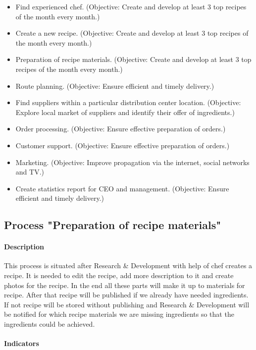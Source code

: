 \documentclass[11pt,a4paper]{article}
\begin{document}
\begin{itemize}
    \item Find experienced chef. (Objective: Create and develop at least 3 top recipes of the month every month.)
    \item Create a new recipe. (Objective: Create and develop at least 3 top recipes of the month every month.)
    \item Preparation of recipe materials. (Objective: Create and develop at least 3 top recipes of the month every month.)
    \item Route planning. (Objective: Ensure efficient and timely delivery.)
    \item Find suppliers within a particular distribution center location. (Objective: Explore local market of suppliers and identify their offer of ingredients.)
    \item Order processing. (Objective: Ensure effective preparation of orders.)
    \item Customer support. (Objective: Ensure effective preparation of orders.)
    \item Marketing. (Objective: Improve propagation via the internet, social networks and TV.)
    \item Create statistics report for CEO and management. (Objective: Ensure efficient and timely delivery.)
\end{itemize}

\newpage

\subsection{Process "Preparation of recipe materials"}

\paragraph{Description}

This process is situated after Research \& Development with help of chef creates a recipe. It is needed to edit the recipe, add more description to it and create photos for the recipe. In the end all these parts will make it up to materials for recipe. After that recipe will be published if we already have needed ingredients. If not recipe will be stored without publishing and Research \& Development will be notified for which recipe materials we are missing ingredients so that the ingredients could be achieved.

\paragraph{Indicators}
\end{document}
